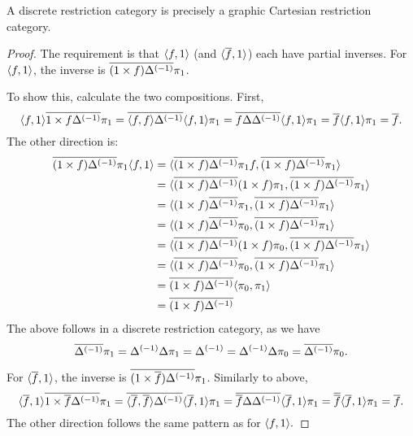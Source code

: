 \begin{lemma}\label{lem:a_discrete_crc_is_precisely_a_graphic_crc}
  A discrete restriction category is precisely a graphic Cartesian restriction category.
\end{lemma}
\begin{proof}
  The requirement is that $\langle f,1\rangle$ (and $\langle\overline{f},1\rangle$) each have partial inverses. For
  $\langle f,1\rangle$, the inverse is $\overline{(1 \times f){\Delta}^{(-1)}} \pi_1$.

  To show this, calculate  the two compositions. First,
  \[
    \<f,1\> \rst{1 \times f \inv{\Delta}} \pi_1 =
      \rst{\<f,f\> \inv{\Delta}}\<f,1\>\pi_1 %
    = \rst{f \Delta \inv{\Delta}}\<f,1\>\pi_1 %
    = \rst{f}\<f,1\>\pi_1 %
    = \rst{f}.%
  \]
  The other direction is:
  \begin{align*}
    \rst{(1 \times f)\inv{\Delta}} \pi_1 \<f,1\>
      &= \< \rst{(1 \times f)\inv{\Delta}} \pi_1 f ,
      \rst{(1 \times f)\inv{\Delta}}\pi_1 \>\\ %
    &= \< \rst{(1 \times f)\inv{\Delta}} (1 \times f) \pi_1,
      \rst{(1 \times f)\inv{\Delta}}\pi_1 \>\\ %
    &= \< (1 \times f )\rst{\inv{\Delta}} \pi_1 ,
      \rst{(1 \times f)\inv{\Delta}}\pi_1 \>\\ %
    &= \< (1 \times f) \rst{\inv{\Delta}} \pi_0 ,
      \rst{(1 \times f)\inv{\Delta}}\pi_1 \>\\ %
    &= \< \rst{(1 \times f)\inv{\Delta}} (1 \times f) \pi_0,
      \rst{(1 \times f)\inv{\Delta}}\pi_1 \>\\ %
    &= \< \rst{(1 \times f)\inv{\Delta}} \pi_0,
      \rst{(1 \times f)\inv{\Delta}}\pi_1 \>\\ %
    &= \rst{(1 \times f)\inv{\Delta}} \< \pi_0, \pi_1 \>\\ %
    &= \rst{(1 \times f)\inv{\Delta}}
  \end{align*}
  The above follows in a discrete restriction category, as we have
  \begin{equation*}
    \overline{{\Delta}^{(-1)}} \pi_1 = {\Delta}^{(-1)} \Delta \pi_1 = {\Delta}^{(-1)} = {\Delta}^{(-1)} \Delta \pi_0 = \overline{{\Delta}^{(-1)}} \pi_0.
  \end{equation*}

  For $\langle\overline{f},1\rangle$, the inverse is $\overline{(1 \times \overline{f}){\Delta}^{(-1)}} \pi_1$. Similarly
  to above,
  \[
    \<\rst{f},1\> \rst{1 \times \rst{f} \inv{\Delta}} \pi_1 =
      \rst{\<\rst{f},\rst{f}\> \inv{\Delta}}\<\rst{f},1\>\pi_1 %
    = \rst{\rst{f} \Delta \inv{\Delta}}\<\rst{f},1\>\pi_1 %
    = \rst{\rst{f}}\<\rst{f},1\>\pi_1 %
    = \rst{f}.%
  \]
  The other direction follows the same pattern as for $\langle f,1\rangle.$
\end{proof}


%


